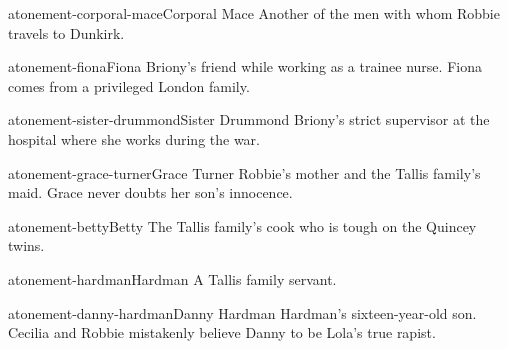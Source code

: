 \documentclass[preview]{standalone}
\begin{document}
\begin{snippetcharacter}{atonement-corporal-mace}{Corporal Mace}
    Another of the men with whom Robbie travels to Dunkirk.
\end{snippetcharacter}

\begin{snippetcharacter}{atonement-fiona}{Fiona}
    Briony's friend while working as a trainee nurse. Fiona comes from a privileged London family.
\end{snippetcharacter}

\begin{snippetcharacter}{atonement-sister-drummond}{Sister Drummond}
    Briony's strict supervisor at the hospital where she works during the war.
\end{snippetcharacter}

\begin{snippetcharacter}{atonement-grace-turner}{Grace Turner}
    Robbie's mother and the Tallis family's maid. Grace never doubts her son's innocence.
\end{snippetcharacter}

\begin{snippetcharacter}{atonement-betty}{Betty}
    The Tallis family's cook who is tough on the Quincey twins.
\end{snippetcharacter}

\begin{snippetcharacter}{atonement-hardman}{Hardman}
    A Tallis family servant.
\end{snippetcharacter}

\begin{snippetcharacter}{atonement-danny-hardman}{Danny Hardman}
    Hardman's sixteen-year-old son. Cecilia and Robbie mistakenly believe Danny to be Lola's true rapist.
\end{snippetcharacter}

\end{document}
